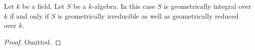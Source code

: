 \begin{lemma}
\label{lemma-geometrically-integral}
Let $k$ be a field.
Let $S$ be a $k$-algebra.
In this case $S$ is geometrically integral over $k$ if and only if
$S$ is geometrically irreducible as well as geometrically reduced over $k$.
\end{lemma}

\begin{proof}
Omitted.
\end{proof}